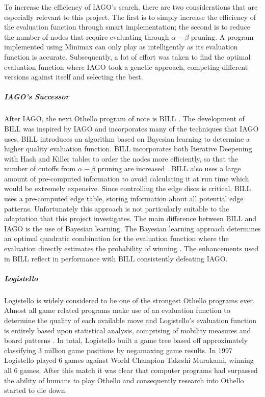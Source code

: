 \documentclass[12pt,a4paper]{article}
\begin{document}
To increase the efficiency of IAGO's search, there are two considerations that are especially relevant to this project. The first is to simply increase the efficiency of the evaluation function through smart implementation; the second is to reduce the number of nodes that require evaluating through $\alpha-\beta$ pruning. A program implemented using Minimax can only play as intelligently as its evaluation function is accurate. Subsequently, a lot of effort was taken to find the optimal evaluation function where IAGO took a genetic approach, competing different versions against itself and selecting the best.

\bigskip
\subparagraph*{IAGO's Successor}
After IAGO, the next Othello program of note is BILL \cite{lee1990development}. The development of BILL was inspired by IAGO and incorporates many of the techniques that IAGO uses. BILL introduces an algorithm based on Bayesian learning to determine a higher quality evaluation function. BILL incorporates both Iterative Deepening with Hash and Killer tables to order the nodes more efficiently, so that the number of cutoffs from $\alpha-\beta$ pruning are increased \cite{lee1990development}.
BILL also uses a large amount of pre-computed information to avoid calculating it at run time which would be extremely expensive. Since controlling the edge discs is critical, BILL uses a pre-computed edge table, storing information about all potential edge patterns. Unfortunately this approach is not particularly suitable to the adaptation that this project investigates. The main difference between BILL and IAGO is the use of Bayesian learning. The Bayesian learning approach determines an optimal quadratic combination for the evaluation function where the evaluation directly estimates the probability of winning \cite{lee1990development}. The enhancements used in BILL reflect in performance with BILL consistently defeating IAGO.

\subparagraph*{Logistello}
Logistello is widely considered to be one of the strongest Othello programs ever. Almost all game related programs make use of an evaluation function to determine the quality of each available move and Logistello's evaluation function is entirely based upon statistical analysis, comprising of mobility measures and board patterns \cite{buro1997evaluation}. In total, Logistello built a game tree based off approximately classifying 3 million game positions by negamaxing game results. In 1997 Logistello played 6 games against World Champion Takeshi Murakami, winning all 6 games. After this match it was clear that computer programs had surpassed the ability of humans to play Othello and consequently research into Othello started to die down. 
\end{document}
